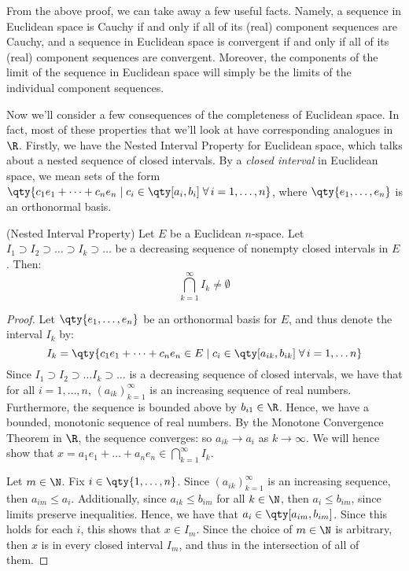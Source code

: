 From the above proof, we can take away a few useful facts. Namely, a sequence in Euclidean space is Cauchy if and only if all of its (real) component sequences are Cauchy, and a sequence in Euclidean space is convergent if and only if all of its (real) component sequences are convergent. Moreover, the components of the limit of the sequence in Euclidean space will simply be the limits of the individual component sequences.

\vspace{3mm}

Now we'll consider a few consequences of the completeness of Euclidean space. In fact, most of these properties that we'll look at have corresponding analogues in \( \R \). Firstly, we have the Nested Interval Property for Euclidean space, which talks about a nested sequence of closed intervals. By a \emph{closed interval} in Euclidean space, we mean sets of the form \( \qty{c_1e_1+\dots+c_ne_n\mid c_i\in\qty[a_i,b_i] \;\forall\,i=1,\dots,n}  \), where \( \qty{e_1,\dots,e_n} \) is an orthonormal basis.

\begin{theorem}
  \label{thm:NIP}
  (Nested Interval Property) Let \( E \) be a Euclidean \( n \)-space. Let \( I_1\supset I_2\supset\dots\supset I_k\supset\dots \) be a decreasing sequence of nonempty closed intervals in \( E \). Then:
  \[ \bigcap_{k=1}^\infty I_k\neq\emptyset \]
\end{theorem}
\begin{proof}
  Let \( \qty{e_1,\dots,e_n} \) be an orthonormal basis for \( E \), and thus denote the interval \( I_k \) by:
  \[ I_k=\qty{c_1e_1+\dots +c_ne_n\in E\mid c_i\in \qty[a_{ik},b_{ik}]\;\forall\,i=1,\dots n} \]
  Since \( I_1\supset I_2\supset\dots I_k\supset\dots \) is a decreasing sequence of closed intervals, we have that for all \( i=1,\dots,n \), \( (a_{ik})_{k=1}^\infty \) is an increasing sequence of real numbers. Furthermore, the sequence is bounded above by \( b_{i1}\in\R \). Hence, we have a bounded, monotonic sequence of real numbers. By the Monotone Convergence Theorem in \( \R \), the sequence converges: so \( a_{ik}\to a_i \) as \( k\to\infty \). We will hence show that \( x=a_1e_1+\dots+a_ne_n\in\bigcap_{k=1}^\infty I_k \).

  \vspace{3mm}

  Let \( m\in\N \). Fix \( i\in\qty{1,\dots,n} \). Since \( (a_{ik})_{k=1}^\infty \) is an increasing sequence, then \( a_{im}\leq a_i \). Additionally, since \( a_{ik}\leq b_{im} \) for all \( k\in\N \), then \( a_i\leq b_{im} \), since limits preserve inequalities. Hence, we have that \( a_i\in\qty[a_{im},b_{im}] \). Since this holds for each \( i \), this shows that \( x\in I_m \). Since the choice of \( m\in\N \) is arbitrary, then \( x \) is in every closed interval \( I_m \), and thus in the intersection of all of them.
\end{proof}

